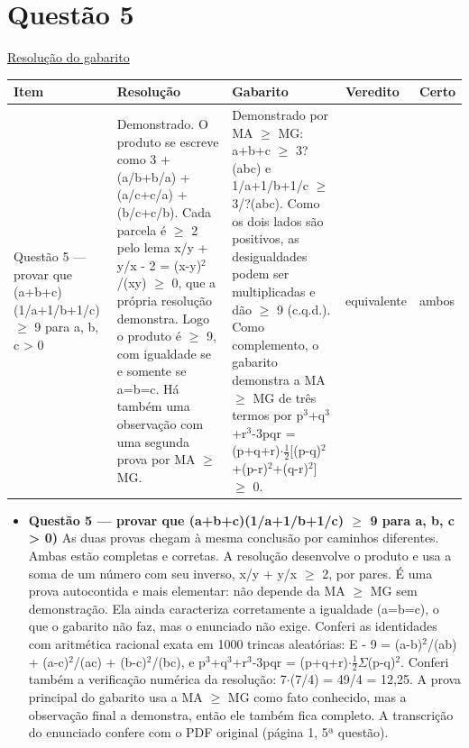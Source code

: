 \documentclass{article}%
\begin{document}
\section*{Questão 5}%
\href{https://poliedroresolve.sistemapoliedro.com.br/vestibulares/ime/2026/ime-2-fase-dia-1-23-10-2025-2-fase-dia-1/dissertativa-5-matematica-2-fase-dia-1-ime-2026}{Resolução do gabarito}\par\smallskip%
\begin{longtable}{@{}p{} p{} p{} p{} p{}@{}}\toprule Item & Resolução & Gabarito & Veredito & Certo \\ \midrule
Questão 5 --- provar que (a+b+c)(1/a+1/b+1/c) $\geq$ 9 para a, b, c > 0 & Demonstrado. O produto se escreve como 3 + (a/b+b/a) + (a/c+c/a) + (b/c+c/b). Cada parcela é $\geq$ 2 pelo lema x/y + y/x - 2 = (x-y)$^2$/(xy) $\geq$ 0, que a própria resolução demonstra. Logo o produto é $\geq$ 9, com igualdade se e somente se a=b=c. Há também uma observação com uma segunda prova por MA $\geq$ MG. & Demonstrado por MA $\geq$ MG: a+b+c $\geq$ 3?(abc) e 1/a+1/b+1/c $\geq$ 3/?(abc). Como os dois lados são positivos, as desigualdades podem ser multiplicadas e dão $\geq$ 9 (c.q.d.). Como complemento, o gabarito demonstra a MA $\geq$ MG de três termos por p$^3$+q$^3$+r$^3$-3pqr = (p+q+r)$\cdot$$\frac12${[}(p-q)$^2$+(p-r)$^2$+(q-r)$^2${]} $\geq$ 0. & equivalente & ambos \\
\bottomrule\end{longtable}%
\begin{itemize}%
\item%
\textbf{Questão 5 --- provar que (a+b+c)(1/a+1/b+1/c) $\geq$ 9 para a, b, c > 0)} As duas provas chegam à mesma conclusão por caminhos diferentes. Ambas estão completas e corretas. A resolução desenvolve o produto e usa a soma de um número com seu inverso, x/y + y/x $\geq$ 2, por pares. É uma prova autocontida e mais elementar: não depende da MA $\geq$ MG sem demonstração. Ela ainda caracteriza corretamente a igualdade (a=b=c), o que o gabarito não faz, mas o enunciado não exige. Conferi as identidades com aritmética racional exata em 1000 trincas aleatórias: E - 9 = (a-b)$^2$/(ab) + (a-c)$^2$/(ac) + (b-c)$^2$/(bc), e p$^3$+q$^3$+r$^3$-3pqr = (p+q+r)$\cdot$$\frac12$$\Sigma$(p-q)$^2$. Conferi também a verificação numérica da resolução: 7$\cdot$(7/4) = 49/4 = 12,25. A prova principal do gabarito usa a MA $\geq$ MG como fato conhecido, mas a observação final a demonstra, então ele também fica completo. A transcrição do enunciado confere com o PDF original (página 1, 5ª questão).%
\end{itemize}%
\end{document}
